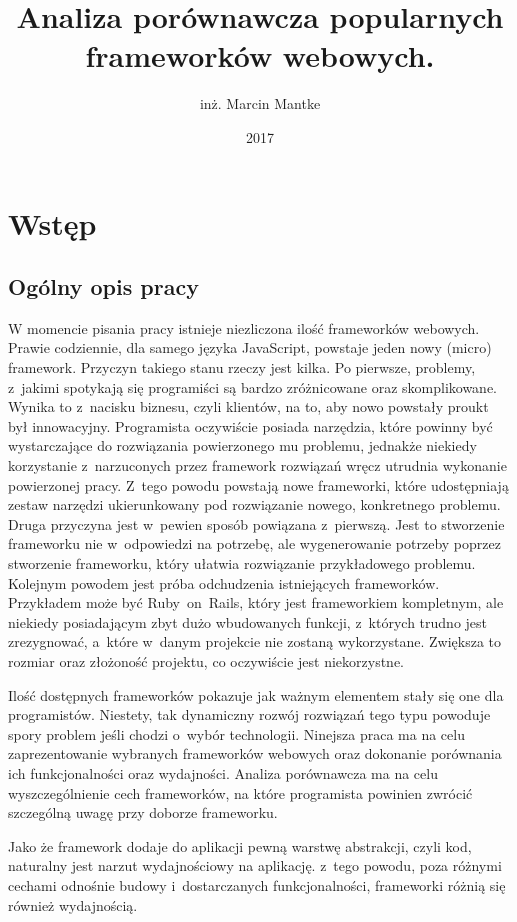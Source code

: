 \documentclass[mgr,oneside]{mgr}
\author{inż. Marcin Mantke}
\title{Analiza porównawcza popularnych frameworków webowych.}
\date{2017}
\begin{document}
\maketitle
\tableofcontents
\chapter{Wstęp}
\section{Ogólny opis pracy}
W momencie pisania pracy istnieje niezliczona ilość frameworków webowych. Prawie codziennie, dla samego języka JavaScript, powstaje jeden nowy (micro) framework. Przyczyn takiego stanu rzeczy jest kilka. Po pierwsze, problemy, z~jakimi spotykają się programiści są bardzo zróżnicowane oraz skomplikowane. Wynika to z~nacisku biznesu, czyli klientów, na to, aby nowo powstały proukt był innowacyjny. Programista oczywiście posiada narzędzia, które powinny być wystarczające do rozwiązania powierzonego mu problemu, jednakże niekiedy korzystanie z~narzuconych przez framework rozwiązań wręcz utrudnia wykonanie powierzonej pracy. Z~tego powodu powstają nowe frameworki, które udostępniają zestaw narzędzi ukierunkowany pod rozwiązanie nowego, konkretnego problemu. Druga przyczyna jest w~pewien sposób powiązana z~pierwszą. Jest to stworzenie frameworku nie w~odpowiedzi na potrzebę, ale wygenerowanie potrzeby poprzez stworzenie frameworku, który ułatwia rozwiązanie przykładowego problemu. Kolejnym powodem jest próba odchudzenia istniejących frameworków. Przykładem może być Ruby~on~Rails, który jest frameworkiem kompletnym, ale niekiedy posiadającym zbyt dużo wbudowanych funkcji, z~których trudno jest zrezygnować, a~które w~danym projekcie nie zostaną wykorzystane. Zwiększa to rozmiar oraz złożoność projektu, co oczywiście jest niekorzystne.

Ilość dostępnych frameworków pokazuje jak ważnym elementem stały się one dla programistów. Niestety, tak dynamiczny rozwój rozwiązań tego typu powoduje spory problem jeśli chodzi o~wybór technologii. Ninejsza praca ma na celu zaprezentowanie wybranych frameworków webowych oraz dokonanie porównania ich funkcjonalności oraz wydajności. Analiza porównawcza ma na celu wyszczególnienie cech frameworków, na które programista powinien zwrócić szczególną uwagę przy doborze frameworku.

Jako że framework dodaje do aplikacji pewną warstwę abstrakcji, czyli kod, naturalny jest narzut wydajnościowy na aplikację. z~tego powodu, poza różnymi cechami odnośnie budowy i~dostarczanych funkcjonalności, frameworki różnią się również wydajnością.
\end{document}
